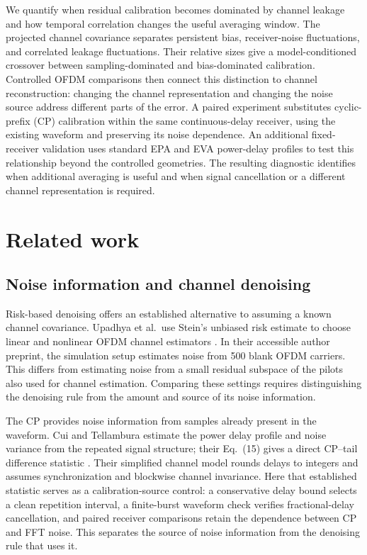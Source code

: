 We quantify when residual calibration becomes dominated by channel leakage
and how temporal correlation changes the useful averaging window. The
projected channel covariance separates persistent bias, receiver-noise
fluctuations, and correlated leakage fluctuations. Their relative sizes give
a model-conditioned crossover between sampling-dominated and bias-dominated
calibration. Controlled OFDM comparisons then connect this distinction to
channel reconstruction: changing the channel representation and changing the
noise source address different parts of the error. A paired experiment
substitutes cyclic-prefix (CP) calibration within the same continuous-delay
receiver, using the existing waveform and preserving its noise dependence.
An additional fixed-receiver validation uses standard EPA and EVA power-delay
profiles to test this relationship beyond the controlled geometries.
The resulting diagnostic identifies when additional averaging is useful and
when signal cancellation or a different channel representation is required.

\section{Related work}
\label{sec:related}

\subsection{Noise information and channel denoising}
Risk-based denoising offers an established alternative to assuming a known
channel covariance. Upadhya et al.\ use Stein's unbiased risk estimate to choose
linear and nonlinear OFDM channel estimators \cite{upadhya2016risk}. In their
accessible author preprint, the simulation setup estimates noise from 500 blank
OFDM carriers. This differs from estimating noise from a small residual
subspace of the pilots also used for channel estimation. Comparing these
settings requires distinguishing the denoising rule from the amount and source
of its noise information.

The CP provides noise information from samples already present in the waveform.
Cui and Tellambura estimate the power delay profile and noise variance from
the repeated signal structure; their Eq.~(15) gives a direct CP--tail
difference statistic \cite{cui2006pdpnoise}. Their simplified channel model
rounds delays to integers and assumes synchronization and blockwise channel
invariance. Here that established statistic serves as a calibration-source
control: a conservative delay bound selects a clean repetition interval, a
finite-burst waveform check verifies fractional-delay cancellation, and paired
receiver comparisons retain the dependence between CP and FFT noise. This
separates the source of noise information from the denoising rule that uses it.

